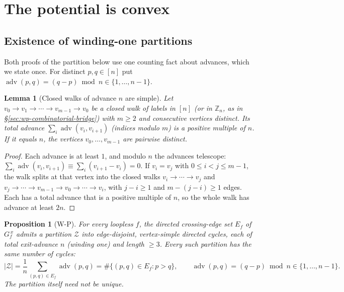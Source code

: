\documentclass[11pt]{article}
\newtheorem{proposition}[theorem]{Proposition}
\newtheorem{lemma}[theorem]{Lemma}
\theoremstyle{definition}
\begin{document}
\section{The potential is convex}\label{sec:convex}

\subsection{Existence of winding-one partitions}
Both proofs of the partition below use one counting fact about advances, which we state once. For
distinct $p,q\in[n]$ put $\operatorname{adv}(p,q)=(q-p)\bmod n\in\{1,\ldots,n-1\}$.

\begin{lemma}[Closed walks of advance $n$ are simple]\label{lem:winding-simple}
Let $v_0\to v_1\to\cdots\to v_{m-1}\to v_0$ be a closed walk of labels in $[n]$ (or in
$\mathbb Z_n$, as in \S\ref{sec:wp-combinatorial-bridge}) with $m\ge2$ and consecutive vertices
distinct. Its total advance $\sum_i\operatorname{adv}(v_i,v_{i+1})$ (indices modulo $m$) is a
positive multiple of $n$. If it equals $n$, the vertices $v_0,\dots,v_{m-1}$ are pairwise distinct.
\end{lemma}

\begin{proof}
Each advance is at least $1$, and modulo $n$ the advances telescope:
$\sum_i\operatorname{adv}(v_i,v_{i+1})\equiv\sum_i(v_{i+1}-v_i)=0$. If $v_i=v_j$ with $0\le i<j\le m-1$,
the walk splits at that vertex into the closed walks $v_i\to\cdots\to v_j$ and
$v_j\to\cdots\to v_{m-1}\to v_0\to\cdots\to v_i$, with $j-i\ge1$ and $m-(j-i)\ge1$ edges. Each has a
total advance that is a positive multiple of $n$, so the whole walk has advance at least $2n$.
\end{proof}

\begin{proposition}[W-P]\label{prop:wp}
For every loopless $f$, the directed crossing-edge set $E_f$ of $G_f^{\,x}$ admits a
partition $\mathcal Z$ into edge-disjoint, vertex-simple directed cycles, each of total
exit-advance $n$ (\emph{winding one}) and length $\ge3$.
Every such partition has the same number of cycles:
\begin{equation}\label{eq:wp-cycle-count}
 |\mathcal Z|=\frac1n\sum_{(p,q)\in E_f}\operatorname{adv}(p,q)
 =\#\{(p,q)\in E_f:p>q\},
 \qquad \operatorname{adv}(p,q)=(q-p)\bmod n\in\{1,\ldots,n-1\}.
\end{equation}
The partition itself need not be unique.
\end{proposition}
\end{document}
